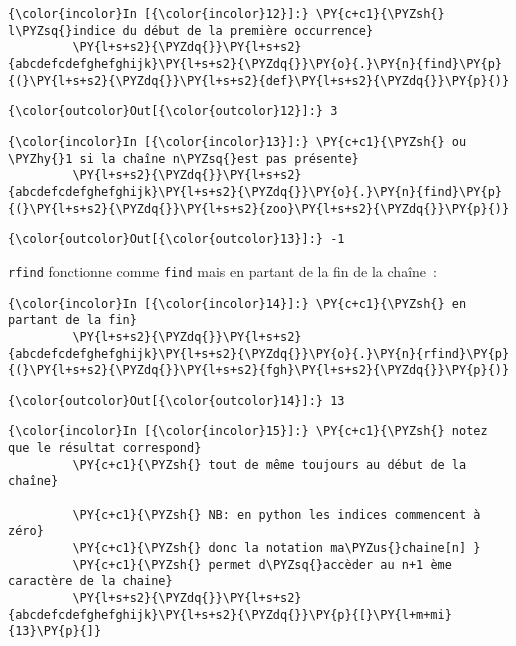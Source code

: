     \begin{Verbatim}[commandchars=\\\{\}]
{\color{incolor}In [{\color{incolor}12}]:} \PY{c+c1}{\PYZsh{} l\PYZsq{}indice du début de la première occurrence}
         \PY{l+s+s2}{\PYZdq{}}\PY{l+s+s2}{abcdefcdefghefghijk}\PY{l+s+s2}{\PYZdq{}}\PY{o}{.}\PY{n}{find}\PY{p}{(}\PY{l+s+s2}{\PYZdq{}}\PY{l+s+s2}{def}\PY{l+s+s2}{\PYZdq{}}\PY{p}{)}
\end{Verbatim}


\begin{Verbatim}[commandchars=\\\{\}]
{\color{outcolor}Out[{\color{outcolor}12}]:} 3
\end{Verbatim}
            
    \begin{Verbatim}[commandchars=\\\{\}]
{\color{incolor}In [{\color{incolor}13}]:} \PY{c+c1}{\PYZsh{} ou \PYZhy{}1 si la chaîne n\PYZsq{}est pas présente}
         \PY{l+s+s2}{\PYZdq{}}\PY{l+s+s2}{abcdefcdefghefghijk}\PY{l+s+s2}{\PYZdq{}}\PY{o}{.}\PY{n}{find}\PY{p}{(}\PY{l+s+s2}{\PYZdq{}}\PY{l+s+s2}{zoo}\PY{l+s+s2}{\PYZdq{}}\PY{p}{)}
\end{Verbatim}


\begin{Verbatim}[commandchars=\\\{\}]
{\color{outcolor}Out[{\color{outcolor}13}]:} -1
\end{Verbatim}
            
    \texttt{rfind} fonctionne comme \texttt{find} mais en partant de la fin
de la chaîne~:

    \begin{Verbatim}[commandchars=\\\{\}]
{\color{incolor}In [{\color{incolor}14}]:} \PY{c+c1}{\PYZsh{} en partant de la fin}
         \PY{l+s+s2}{\PYZdq{}}\PY{l+s+s2}{abcdefcdefghefghijk}\PY{l+s+s2}{\PYZdq{}}\PY{o}{.}\PY{n}{rfind}\PY{p}{(}\PY{l+s+s2}{\PYZdq{}}\PY{l+s+s2}{fgh}\PY{l+s+s2}{\PYZdq{}}\PY{p}{)}
\end{Verbatim}


\begin{Verbatim}[commandchars=\\\{\}]
{\color{outcolor}Out[{\color{outcolor}14}]:} 13
\end{Verbatim}
            
    \begin{Verbatim}[commandchars=\\\{\}]
{\color{incolor}In [{\color{incolor}15}]:} \PY{c+c1}{\PYZsh{} notez que le résultat correspond}
         \PY{c+c1}{\PYZsh{} tout de même toujours au début de la chaîne}
         
         \PY{c+c1}{\PYZsh{} NB: en python les indices commencent à zéro}
         \PY{c+c1}{\PYZsh{} donc la notation ma\PYZus{}chaine[n] }
         \PY{c+c1}{\PYZsh{} permet d\PYZsq{}accèder au n+1 ème caractère de la chaine}
         \PY{l+s+s2}{\PYZdq{}}\PY{l+s+s2}{abcdefcdefghefghijk}\PY{l+s+s2}{\PYZdq{}}\PY{p}{[}\PY{l+m+mi}{13}\PY{p}{]}
\end{Verbatim}


